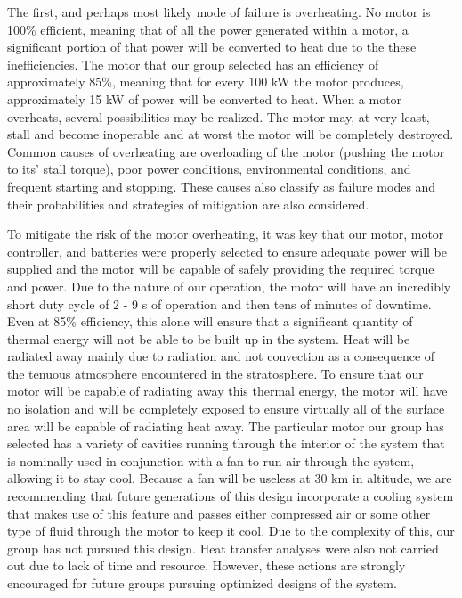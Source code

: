The first, and perhaps most likely mode of failure is overheating. No motor is 100\% efficient, meaning that of all the power generated within a motor, a significant portion of that power will be converted to heat due to the these inefficiencies. The motor that our group selected has an efficiency of approximately 85\%, meaning that for every 100 kW the motor produces, approximately 15 kW of power will be converted to heat. When a motor overheats, several possibilities may be realized. The motor may, at very least, stall and become inoperable and at worst the motor will be completely destroyed. Common causes of overheating are overloading of the motor (pushing the motor to its' stall torque), poor power conditions, environmental conditions, and frequent starting and stopping. These causes also classify as failure modes and their probabilities and strategies of mitigation are also considered. 

To mitigate the risk of the motor overheating, it was key that our motor, motor controller, and batteries were properly selected to ensure adequate power will be supplied and the motor will be capable of safely providing the required torque and power. Due to the nature of our operation, the motor will have an incredibly short duty cycle of 2 - 9 s of operation and then tens of minutes of downtime. Even at 85\% efficiency, this alone will ensure that a significant quantity of thermal energy will not be able to be built up in the system. Heat will be radiated away mainly due to radiation and not convection as a consequence of the tenuous atmosphere encountered in the stratosphere. To ensure that our motor will be capable of radiating away this thermal energy, the motor will have no isolation and will be completely exposed to ensure virtually all of the surface area will be capable of radiating heat away. The particular motor our group has selected has a variety of cavities running through the interior of the system that is nominally used in conjunction with a fan to run air through the system, allowing it to stay cool. Because a fan will be useless at 30 km in altitude, we are recommending that future generations of this design incorporate a cooling system that makes use of this feature and passes either compressed air or some other type of fluid through the motor to keep it cool. Due to the complexity of this, our group has not pursued this design. Heat transfer analyses were also not carried out due to lack of time and resource. However, these actions are strongly encouraged for future groups pursuing optimized designs of the system. 

